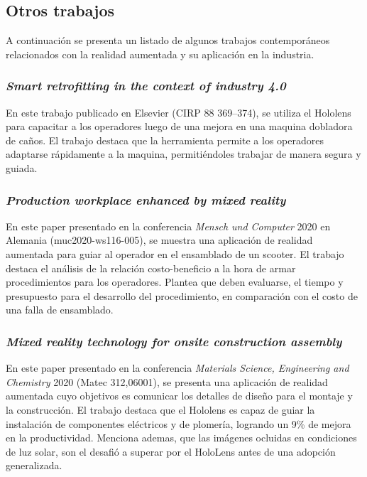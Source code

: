 \subsection{Otros trabajos}

A continuación se presenta un listado de algunos trabajos contemporáneos relacionados con la realidad aumentada y su aplicación en la industria.

\subsubsection{\textit{Smart retrofitting in the context of industry 4.0}}
En este trabajo publicado en Elsevier (CIRP 88 369–374), se utiliza el Hololens para capacitar a los operadores luego de una mejora en una maquina dobladora de caños. El trabajo destaca que la herramienta permite a los operadores adaptarse rápidamente a la maquina, permitiéndoles trabajar de manera segura y guiada.

\subsubsection{\textit{Production workplace enhanced by mixed reality}}
En este paper presentado en la conferencia \textit{Mensch und Computer} 2020 en Alemania (muc2020-ws116-005), se muestra una aplicación de realidad aumentada para guiar al operador en el ensamblado de un scooter. El trabajo destaca el análisis de la relación costo-beneficio a la hora de armar procedimientos para los operadores. Plantea que deben evaluarse, el tiempo y presupuesto para el desarrollo del procedimiento, en comparación con el costo de una falla de ensamblado.

\subsubsection{\textit{Mixed reality technology for onsite construction assembly}}
En este paper presentado en la conferencia \textit{Materials Science, Engineering and Chemistry} 2020 (Matec 312,06001), se presenta una aplicación de realidad aumentada cuyo objetivos es comunicar los detalles de diseño para el montaje y la construcción. El trabajo destaca que el Hololens es capaz de guiar la instalación de componentes eléctricos y de plomería, logrando un 9\% de mejora en la productividad. Menciona ademas, que las imágenes ocluidas en condiciones de luz solar, son el desafió a superar por el HoloLens antes de una adopción generalizada.

